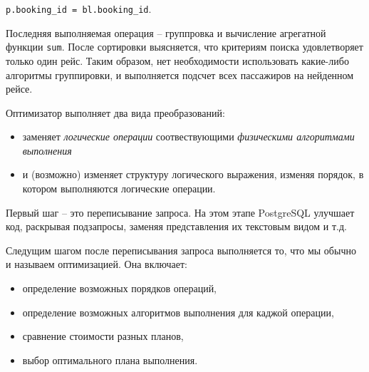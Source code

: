 \documentclass[%
	11pt,
	a4paper,
	utf8,
		]{article}
\begin{document}
\verb|p.booking_id = bl.booking_id|.

Последняя выполняемая операция -- группровка и вычисление агрегатной функции \verb|sum|. После сортировки выясняется, что критериям поиска удовлетворяет только один рейс. Таким образом, нет необходимости использовать какие-либо алгоритмы группировки, и выполняется подсчет всех пассажиров на нейденном рейсе.

Оптимизатор выполняет два вида преобразований:
\begin{itemize}
	\item заменяет \emph{логические операции} соотвествующими \emph{физическими алгоритмами выполнения }
	
	\item и (возможно) изменяет структуру логического выражения, изменяя порядок, в котором выполняются логические операции.
\end{itemize}

Первый шаг -- это переписывание запроса. На этом этапе PostgreSQL улучшает код, раскрывая подзапросы, заменяя представления их текстовым видом и т.д. 


Следущим шагом после переписывания запроса выполняется то, что мы обычно и называем оптимизацией. Она включает:
\begin{itemize}
	\item определение возможных порядков операций,
	
	\item определение возможных алгоритмов выполнения для каджой операции,
	
	\item сравнение стоимости разных планов,
	
	\item выбор оптимального плана выполнения.
\end{itemize}

\end{document}
